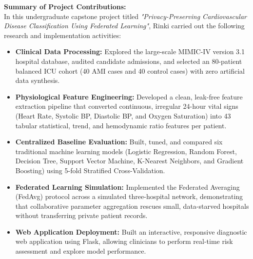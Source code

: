 \noindent \textbf{Summary of Project Contributions:}\\
In this undergraduate capstone project titled \textit{"Privacy-Preserving Cardiovascular Disease Classification Using Federated Learning"}, Rinki carried out the following research and implementation activities:
\begin{itemize}
    \item \textbf{Clinical Data Processing:} Explored the large-scale MIMIC-IV version 3.1 hospital database, audited candidate admissions, and selected an 80-patient balanced ICU cohort (40 AMI cases and 40 control cases) with zero artificial data synthesis.
    \item \textbf{Physiological Feature Engineering:} Developed a clean, leak-free feature extraction pipeline that converted continuous, irregular 24-hour vital signs (Heart Rate, Systolic BP, Diastolic BP, and Oxygen Saturation) into 43 tabular statistical, trend, and hemodynamic ratio features per patient.
    \item \textbf{Centralized Baseline Evaluation:} Built, tuned, and compared six traditional machine learning models (Logistic Regression, Random Forest, Decision Tree, Support Vector Machine, K-Nearest Neighbors, and Gradient Boosting) using 5-fold Stratified Cross-Validation.
    \item \textbf{Federated Learning Simulation:} Implemented the Federated Averaging (FedAvg) protocol across a simulated three-hospital network, demonstrating that collaborative parameter aggregation rescues small, data-starved hospitals without transferring private patient records.
    \item \textbf{Web Application Deployment:} Built an interactive, responsive diagnostic web application using Flask, allowing clinicians to perform real-time risk assessment and explore model performance.
\end{itemize}
